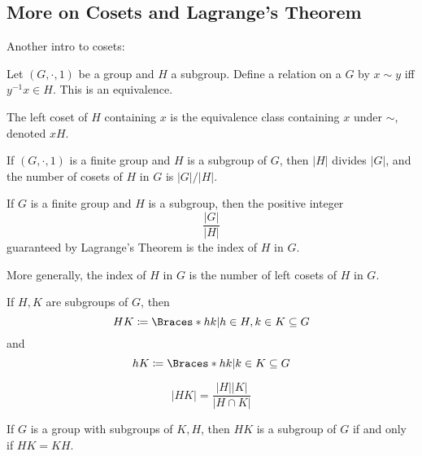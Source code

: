 \documentclass[a5paper]{article}
\begin{document}
\subsection{More on Cosets and Lagrange's Theorem}
Another intro to cosets:
\begin{definition}
	Let $(G,\cdot,1)$ be a group and $H$ a subgroup. Define a relation on a $G$ by
  $x\sim y$ iff $y^{-1}x\in H$. This is an equivalence.

  The left coset of $H$ containing $x$ is the equivalence class containing $x$
  under $\sim$, denoted $xH$.
\end{definition}

\begin{theorem}
	If $(G,\cdot,1)$ is a finite group and $H$ is a subgroup of $G$, then $|H|$
  divides $|G|$, and the number of cosets of $H$ in $G$ is $|G|/|H|$.
\end{theorem}

\begin{definition}
  If $G$ is a finite group and $H$ is a subgroup, then the positive integer
  \begin{equation*}
    \frac{|G|}{|H|}
  \end{equation*}
  guaranteed by Lagrange's Theorem is the index of $H$ in $G$.

  More generally, the index of $H$ in $G$ is the number of left cosets of $H$ in
  $G$.
\end{definition}

\begin{definition}
	If $H,K$ are subgroups of $G$, then
  \begin{equation*}
    HK\coloneqq\braces{hk|h\in H,k\in K}\subseteq G
  \end{equation*}
  and
  \begin{equation*}
    hK\coloneqq\braces{hk|k\in K}\subseteq G
  \end{equation*}
\end{definition}

\begin{lemma}
	\begin{equation*}
    |HK|=\frac{|H||K|}{|H\cap K|}
  \end{equation*}
\end{lemma}

\begin{lemma}
  If $G$ is a group with subgroups of $K,H$, then $HK$ is a subgroup of $G$ if
  and only if $HK=KH$.
\end{lemma}
\end{document}
